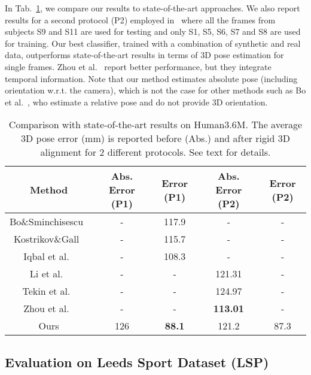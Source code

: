 \documentclass{article}
\begin{document}
In Tab.~\ref{tab:H36M_sota}, we compare our results to
  state-of-the-art approaches. We also report results for a second
  protocol (P2) employed in~\cite{LiZC15,ZhouZLDD16,TekinRLF16} where
  all the frames from subjects S9 and S11 are used for testing and
  only S1, S5, S6, S7 and S8 are used for training. Our best
  classifier, trained with a combination of synthetic and real data,
  outperforms state-of-the-art results in terms of 3D pose estimation
  for single frames. Zhou et al.~\cite{ZhouZLDD16} report better
  performance, but they integrate temporal information. 
Note that our method estimates absolute pose (including orientation
w.r.t. the camera), which is not the case for other methods such as Bo
et al.~\cite{BoS10}, who estimate a relative pose and do not provide
3D orientation. 






  \begin{table} 
\caption{Comparison with state-of-the-art results on Human3.6M. The average 3D pose error (mm) is reported before (Abs.) and after rigid 3D alignment for 2 different protocols. See text for details.}
\vspace{-2mm}\centering
\begin{tabular}{c|c|c|c|c}
Method &  Abs. Error (P1)  &  Error (P1) &  Abs. Error (P2)  &  Error (P2) \\ 
\hline
Bo\&Sminchisescu~\cite{BoS10}  & - & 117.9 & - & -\\
Kostrikov\&Gall~\cite{KostrikovG14} &  - &115.7 & -& -\\
Iqbal et al.~\cite{IqbalGG16} & - & 108.3 & -& -\\ 
\hline  
Li et al.~\cite{LiZC15} & - & - &  121.31 & -\\ 
Tekin et al.~\cite{TekinRLF16}& - & - &  124.97 & -\\ 
Zhou et al.~\cite{ZhouZLDD16}& - & - &  \bf{113.01} & -\\ 
\hline  
Ours  &126 & \bf{88.1} & 121.2 & 87.3\\
\end{tabular} 
\label{tab:H36M_sota}
\end{table}


 


   
 
 \subsection{Evaluation on Leeds Sport Dataset (LSP)}
\end{document}

